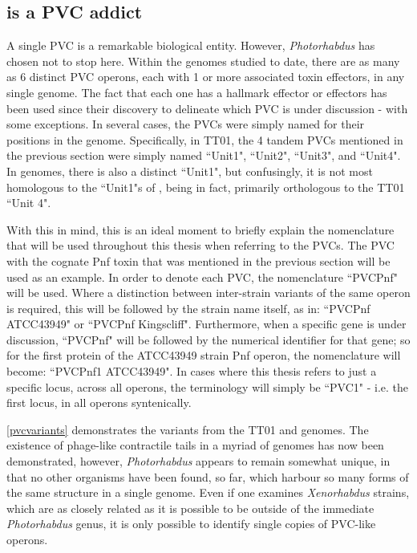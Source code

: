 \subsection{\Pa{} is a PVC addict}
A single PVC is a remarkable biological entity. However, \emph{Photorhabdus} has chosen not to stop here. Within the genomes studied to date, there are as many as 6 distinct PVC operons, each with 1 or more associated toxin effectors, in any single genome. The fact that each one has a hallmark effector or effectors has been used since their discovery to delineate which PVC is under discussion \citep{Yang2006} - with some exceptions. In several cases, the PVCs were simply named for their positions in the genome. Specifically, in \Plum{} TT01, the 4 tandem PVCs mentioned in the previous section were simply named ``Unit1", ``Unit2", ``Unit3", and ``Unit4". In \Pasy {} genomes, there is also a distinct ``Unit1", but confusingly, it is not most homologous to the ``Unit1"s of \Plum, being in fact, primarily orthologous to the \Plum{} TT01 ``Unit 4".

With this in mind, this is an ideal moment to briefly explain the nomenclature that will be used throughout this thesis when referring to the PVCs. The PVC with the cognate Pnf toxin that was mentioned in the previous section will be used as an example. In order to denote each PVC, the nomenclature ``PVCPnf" will be used. Where a distinction between inter-strain variants of the same operon is required, this will be followed by the strain name itself, as in: ``PVCPnf ATCC43949" or ``PVCPnf Kingscliff". Furthermore, when a specific gene is under discussion, ``PVCPnf" will be followed by the numerical identifier for that gene; so for the first protein of the \Pasy{} ATCC43949 strain Pnf operon, the nomenclature will become: ``PVCPnf1 ATCC43949". In cases where this thesis refers to just a specific locus, across all operons, the terminology will simply be ``PVC1" - i.e. the first locus, in all operons syntenically.

\vref{pvcvariants} demonstrates the variants from the \Plum{} TT01 and \Pasy{} genomes. The existence of phage-like contractile tails in a myriad of genomes has now been demonstrated, however, \emph{Photorhabdus} appears to remain somewhat unique, in that no other organisms have been found, so far, which harbour so many forms of the same structure in a single genome. Even if one examines \emph{Xenorhabdus} strains, which are as closely related as it is possible to be outside of the immediate \emph{Photorhabdus} genus, it is only possible to identify single copies of PVC-like operons.

